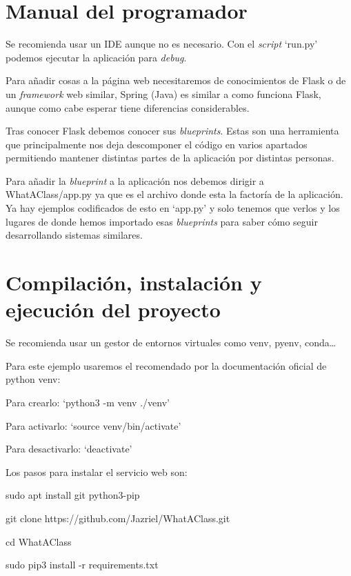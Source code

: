 \section{Manual del programador}

Se recomienda usar un IDE aunque no es necesario. Con el \emph{script} `run.py' podemos ejecutar la aplicación para \emph{debug}. 

Para añadir cosas a la página web necesitaremos de conocimientos de Flask o de un \emph{framework} web similar, Spring (Java) es similar a como funciona Flask, aunque como cabe esperar tiene diferencias considerables.

Tras conocer Flask debemos conocer sus \emph{blueprints}. Estas son una herramienta que principalmente nos deja descomponer el código en varios apartados permitiendo mantener distintas partes de la aplicación por distintas personas.

Para añadir la \emph{blueprint} a la aplicación nos debemos dirigir a WhatAClass/app.py ya que es el archivo donde esta la factoría de la aplicación. Ya hay ejemplos codificados de esto en `app.py' y solo tenemos que verlos y los lugares de donde hemos importado esas \emph{blueprints} para saber cómo seguir desarrollando sistemas similares.


 

\section{Compilación, instalación y ejecución del proyecto}

Se recomienda usar un gestor de entornos virtuales como venv, pyenv, conda\ldots

Para este ejemplo usaremos el recomendado por la documentación oficial de python venv: 
	
Para crearlo: `python3 -m venv ./venv'
	
Para activarlo: `source venv/bin/activate'

Para desactivarlo: `deactivate'

Los pasos para instalar el servicio web son:
\begin{list}{-}{}
\item sudo apt install git python3-pip
\item git clone https://github.com/Jazriel/WhatAClass.git
\item cd WhatAClass
\item sudo pip3 install -r requirements.txt
\end{list}


